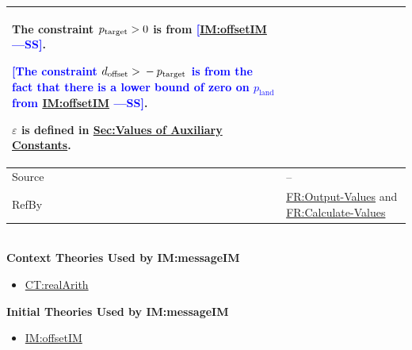 \documentclass[12pt]{article}
\newcommand{\authornote}[3]{\textcolor{#1}{[#3 ---#2]}}
\newcommand{\authornote}[3]{}
\newcommand{\wss}[1]{\authornote{blue}{SS}{#1}}
\newcommand{\gt}{\ensuremath >}
\begin{document}
\begin{minipage}{\textwidth}
\begin{tabular}{>{\raggedright}p{}>{\raggedright\arraybackslash}p{}}
        The constraint ${p_{\text{target}}}\gt{}0$ is from \wss{\hyperref[IM:offsetIM]{IM:offsetIM}}.
        
        \wss{The constraint ${d_{\text{offset}}}\gt{}-{p_{\text{target}}}$ is from the fact that there is a lower bound of zero on ${p_{\text{land}}}$ from \hyperref[IM:offsetIM]{IM:offsetIM}}.
        
        $ε$ is defined in \hyperref[Sec:AuxConstants]{Sec:Values of Auxiliary Constants}.
        
\\ \midrule
Source & --
         
\\ \midrule
RefBy & \hyperref[outputValues]{FR:Output-Values} and \hyperref[calcValues]{FR:Calculate-Values}
        
\\ \bottomrule
\end{tabular}
\end{minipage}
~\\

\noindent \textbf{Context Theories Used by IM:messageIM}

\begin{itemize}
\item \hyperref[CT:realArith]{CT:realArith}
\end{itemize}

\noindent \textbf{Initial Theories Used by IM:messageIM}

\begin{itemize}
\item \hyperref[IM:offsetIM]{IM:offsetIM}
\end{itemize}
\end{document}
